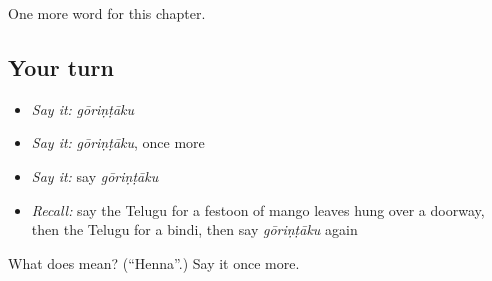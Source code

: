 \begin{grammarlens}[title={What you've built}]
One more word for this chapter.
\end{grammarlens}

\subsection*{Your turn}
\begin{itemize}
\raggedright
  \item \emph{Say it:} \emph{gōriṇṭāku}
  \item \emph{Say it:} \emph{gōriṇṭāku}, once more
  \item \emph{Say it:} say \emph{gōriṇṭāku}
  \item \emph{Recall:} say the Telugu for a festoon of mango leaves hung over a doorway, then the Telugu for a bindi, then say \emph{gōriṇṭāku} again
\end{itemize}

\begin{tcolorbox}[breakable,colback=teal!4,colframe=teal!35!black,title={Before you move on}]
What does  mean? (\textquotedblleft{}Henna\textquotedblright{}.) Say it once more.
\end{tcolorbox}
